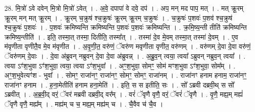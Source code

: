 \documentclass[17pt]{extarticle}
\begin{document}
28. मि॒त्रो॑ ऽवे दवेन् मि॒त्रो मि॒त्रो॑ ऽवेत् । . अ॒वे॒ दपापा॑ वे दवे॒ दप॑ । . अप॒ मन् मद पाप॒ मत् । . मत् क्रू॒रम् क्रू॒रम् मन् मत् क्रू॒रम् । . क्रू॒रम् च॒क्रुष॑ श्च॒क्रुषः॑ क्रू॒रम् क्रू॒रम् च॒क्रुषः॑ । . च॒क्रुषः॑ प॒शवः॑ प॒शव॑ श्च॒क्रुष॑ श्च॒क्रुषः॑ प॒शवः॑ । . प॒शवः॑ क्रमिष्यन्ति क्रमिष्यन्ति प॒शवः॑ प॒शवः॑ क्रमिष्यन्ति । . क्र॒मि॒ष्य॒न्ती तीति॑ क्रमिष्यन्ति क्रमिष्य॒न्तीति॑ । . इति॒ तस्मा॒त् तस्मा॒ दितीति॒ तस्मा᳚त् । . तस्मा॑ दे॒व मे॒वम् तस्मा॒त् तस्मा॑ दे॒वम् । . ए॒व म॑वृणीता वृणीतै॒व मे॒व म॑वृणीत । . अ॒वृ॒णी॒त॒ वरु॑णं॒ ॅवरु॑ण मवृणीता वृणीत॒ वरु॑णम् । . वरु॑णम् दे॒वा दे॒वा वरु॑णं॒ ॅवरु॑णम् दे॒वाः । . दे॒वा अ॑ब्रुवन् नब्रुवन् दे॒वा दे॒वा अ॑ब्रुवन्न् । . अ॒ब्रु॒व॒न् त्वया॒ त्वया᳚ ऽब्रुवन् नब्रुव॒न् त्वया᳚ । . त्वया ऽꣳ॑श॒भुवा ऽꣳ॑श॒भुवा॒ त्वया॒ त्वया ऽꣳ॑श॒भुवा᳚ । . अꣳ॒॒श॒भुवा॒ सोमꣳ॒॒ सोम॑ मꣳश॒भुवा ऽꣳ॑श॒भुवा॒ सोम᳚म् । . अꣳ॒॒श॒भुवेत्यꣳ॑श - भुवा᳚ । . सोमꣳ॒॒ राजा॑नꣳ॒॒ राजा॑नꣳ॒॒ सोमꣳ॒॒ सोमꣳ॒॒ राजा॑नम् । . राजा॑नꣳ हनाम हनाम॒ राजा॑नꣳ॒॒ राजा॑नꣳ हनाम । . ह॒ना॒मेतीति॑ हनाम हना॒मेति॑ । . इति॒ स स इतीति॒ सः । . सो᳚ ऽब्रवी दब्रवी॒थ् स सो᳚ ऽब्रवीत् । . अ॒ब्र॒वी॒द् वरं॒ ॅवर॑ मब्रवी दब्रवी॒द् वर᳚म् । . वरं॑ ॅवृणै वृणै॒ वरं॒ ॅवरं॑ ॅवृणै । . वृ॒णै॒ मह्य॒म् मह्यं॑ ॅवृणै वृणै॒ मह्य᳚म् । . मह्य॑म् च च॒ मह्य॒म् मह्य॑म् च । . चै॒वैव च॑ चै॒व । \newline
\end{document}
